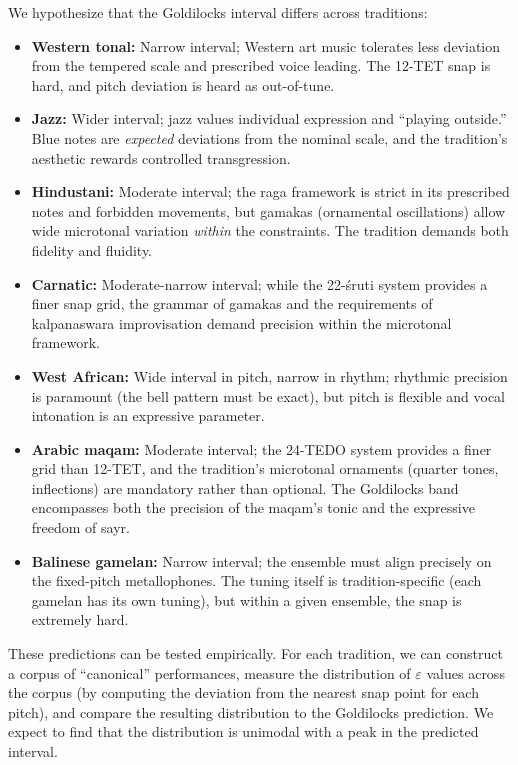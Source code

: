 \documentclass[cmj]{article}
\newcommand{\eps}{\varepsilon}
\begin{document}
We hypothesize that the Goldilocks interval differs across traditions:
\begin{itemize}[nosep]
  \item \textbf{Western tonal:} Narrow interval; Western art music tolerates
    less deviation from the tempered scale and prescribed voice leading.
    The 12-TET snap is hard, and pitch deviation is heard as out-of-tune.
  \item \textbf{Jazz:} Wider interval; jazz values individual expression and
    ``playing outside.'' Blue notes are \emph{expected} deviations from the
    nominal scale, and the tradition's aesthetic rewards controlled
    transgression.
  \item \textbf{Hindustani:} Moderate interval; the raga framework is strict
    in its prescribed notes and forbidden movements, but gamakas (ornamental
    oscillations) allow wide microtonal variation \emph{within} the
    constraints. The tradition demands both fidelity and fluidity.
  \item \textbf{Carnatic:} Moderate-narrow interval; while the 22-\'{s}ruti
    system provides a finer snap grid, the grammar of gamakas and the
    requirements of kalpanaswara improvisation demand precision within the
    microtonal framework.
  \item \textbf{West African:} Wide interval in pitch, narrow in rhythm;
    rhythmic precision is paramount (the bell pattern must be exact), but
    pitch is flexible and vocal intonation is an expressive parameter.
  \item \textbf{Arabic maqam:} Moderate interval; the 24-TEDO system provides
    a finer grid than 12-TET, and the tradition's microtonal ornaments
    (quarter tones, inflections) are mandatory rather than optional. The
    Goldilocks band encompasses both the precision of the maqam's tonic and
    the expressive freedom of sayr.
  \item \textbf{Balinese gamelan:} Narrow interval; the ensemble must align
    precisely on the fixed-pitch metallophones. The tuning itself is
    tradition-specific (each gamelan has its own tuning), but within a given
    ensemble, the snap is extremely hard.
\end{itemize}

These predictions can be tested empirically. For each tradition, we can
construct a corpus of ``canonical'' performances, measure the distribution of
$\eps$ values across the corpus (by computing the deviation from the nearest
snap point for each pitch), and compare the resulting distribution to the
Goldilocks prediction. We expect to find that the distribution is unimodal
with a peak in the predicted interval.
\end{document}
